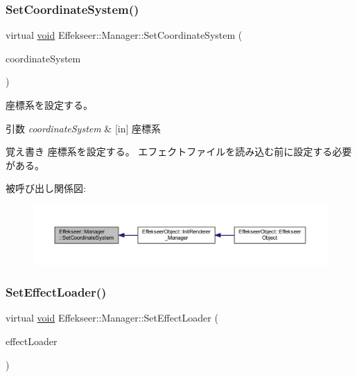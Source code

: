 \subsubsection{\texorpdfstring{Set\+Coordinate\+System()}{SetCoordinateSystem()}}
{\footnotesize\ttfamily virtual \mbox{\hyperlink{namespace_effekseer_ab34c4088e512200cf4c2716f168deb56}{void}} Effekseer\+::\+Manager\+::\+Set\+Coordinate\+System (\begin{DoxyParamCaption}\item[{\mbox{\hyperlink{namespace_effekseer_ac8508f8823c5fcf36aac5d2ddee23765}{Coordinate\+System}}}]{coordinate\+System }\end{DoxyParamCaption})\hspace{0.3cm}{\ttfamily [pure virtual]}}



座標系を設定する。 


\begin{DoxyParams}{引数}
{\em coordinate\+System} & \mbox{[}in\mbox{]} 座標系 \\
\hline
\end{DoxyParams}
\begin{DoxyNote}{覚え書き}
座標系を設定する。 エフェクトファイルを読み込む前に設定する必要がある。 
\end{DoxyNote}
被呼び出し関係図\+:\nopagebreak
\begin{figure}[H]
\begin{center}
\leavevmode
\includegraphics[width=350pt]{class_effekseer_1_1_manager_a804730036eada2d3e1883ed366c265cc_icgraph}
\end{center}
\end{figure}
\mbox{\label{class_effekseer_1_1_manager_a1e183d9310c8562279707786e5503f8f}} 
\subsubsection{\texorpdfstring{Set\+Effect\+Loader()}{SetEffectLoader()}}
{\footnotesize\ttfamily virtual \mbox{\hyperlink{namespace_effekseer_ab34c4088e512200cf4c2716f168deb56}{void}} Effekseer\+::\+Manager\+::\+Set\+Effect\+Loader (\begin{DoxyParamCaption}\item[{\mbox{\hyperlink{class_effekseer_1_1_effect_loader}{Effect\+Loader}} $\ast$}]{effect\+Loader }\end{DoxyParamCaption})\hspace{0.3cm}{\ttfamily [pure virtual]}}



